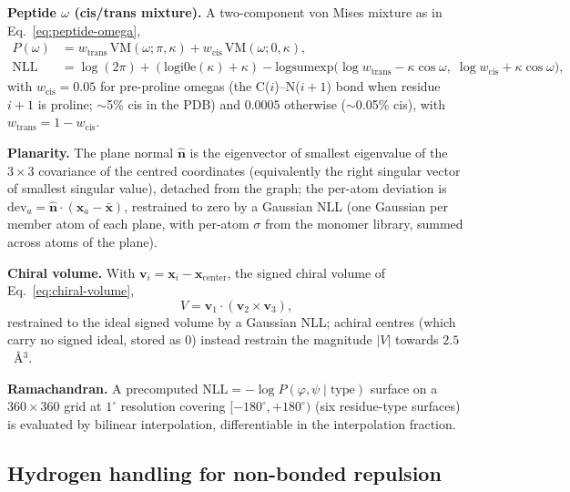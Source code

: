 \documentclass{iucrjournals}
\begin{document}
\textbf{Peptide $\omega$ (cis/trans mixture).} A two-component von Mises mixture
as in Eq.~\ref{eq:peptide-omega},
%
\begin{align}
  P(\omega) &= w_\mathrm{trans}\,\mathrm{VM}(\omega;\pi,\kappa)
  + w_\mathrm{cis}\,\mathrm{VM}(\omega;0,\kappa), \\
  \mathrm{NLL} &= \log(2\pi) + (\mathrm{logi0e}(\kappa) + \kappa)
  - \mathrm{logsumexp}\bigl(\log w_\mathrm{trans} - \kappa\cos\omega,\;
  \log w_\mathrm{cis} + \kappa\cos\omega\bigr),
  \label{eq:peptide-omega}
\end{align}
%
with $w_\mathrm{cis} = 0.05$ for pre-proline omegas (the C($i$)--N($i{+}1$)
bond when residue $i{+}1$ is proline; $\sim$5\% cis in the PDB) and
$0.0005$ otherwise ($\sim$0.05\% cis), with $w_\mathrm{trans} = 1 - w_\mathrm{cis}$.

\textbf{Planarity.} The plane normal $\widehat{\mathbf{n}}$ is the eigenvector
of smallest eigenvalue of the $3\times3$ covariance of the centred
coordinates (equivalently the right singular vector of smallest singular
value), detached from the graph; the per-atom deviation is
$\mathrm{dev}_{a} = \widehat{\mathbf{n}}\cdot(\mathbf{x}_{a} - \bar{\mathbf{x}})$,
restrained to zero by a Gaussian NLL (one Gaussian per member atom of
each plane, with per-atom $\sigma$ from the monomer library, summed
across atoms of the plane).

\textbf{Chiral volume.} With
$\mathbf{v}_{i} = \mathbf{x}_{i} - \mathbf{x}_\mathrm{center}$, the signed
chiral volume of Eq.~\ref{eq:chiral-volume},
%
\begin{equation}
  V = \mathbf{v}_{1}\cdot(\mathbf{v}_{2}\times\mathbf{v}_{3}),
  \label{eq:chiral-volume}
\end{equation}
%
restrained to the ideal signed volume by a Gaussian NLL; achiral centres (which
carry no signed ideal, stored as $0$) instead restrain the magnitude $|V|$ towards
$2.5$~\AA{}$^{3}$.

\textbf{Ramachandran.} A precomputed
$\mathrm{NLL} = -\log P(\varphi,\psi \mid \mathrm{type})$ surface on a
$360 \times 360$ grid at $1^{\circ}$ resolution covering
$[-180^{\circ}, +180^{\circ})$ (six residue-type surfaces) is evaluated by
bilinear interpolation, differentiable in the interpolation fraction.

\subsection{Hydrogen handling for non-bonded repulsion}\label{sec:hydrogen}
\end{document}
